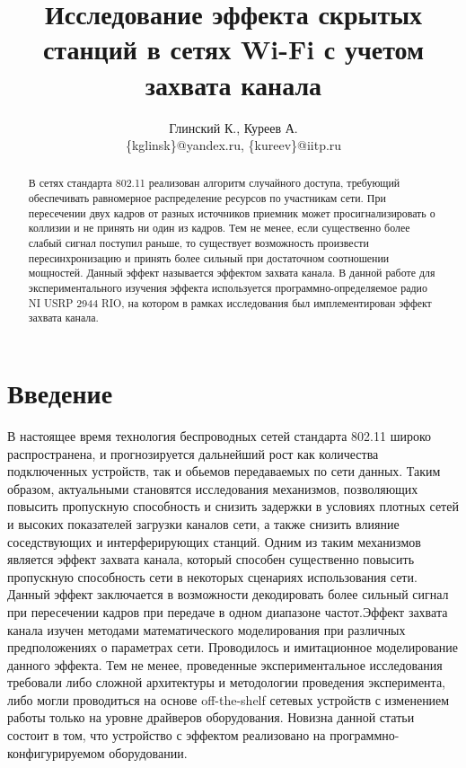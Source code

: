 \documentclass{llncs}
\title{Исследование эффекта скрытых станций в сетях Wi-Fi с учетом захвата канала}
\author{
Глинский К., Куреев А.\\
\{kglinsk\}@yandex.ru, \{kureev\}@iitp.ru\\
}
\institute{ИППИ РАН}
\begin{document}
\maketitle

\begin{abstract}
В сетях стандарта 802.11 реализован алгоритм случайного доступа, требующий обеспечивать равномерное распределение ресурсов по участникам сети. При пересечении двух кадров от разных источников приемник может просигнализировать о коллизии и не принять ни один из кадров. Тем не менее, если существенно более слабый сигнал поступил раньше, то существует  возможность произвести пересинхронизацию и принять более сильный при достаточном соотношении мощностей. Данный эффект называется эффектом захвата канала. В данной работе для экспериментального изучения эффекта используется  программно-определяемое радио NI USRP 2944 RIO, на котором в рамках  исследования  был имплементирован эффект захвата канала.
\end{abstract}


\section{Введение}
В настоящее время технология беспроводных сетей стандарта 802.11 широко распространена, и прогнозируется дальнейший рост как количества подключенных устройств, так и обьемов передаваемых по сети данных. Таким образом, актуальными становятся исследования механизмов, позволяющих повысить пропускную способность и снизить задержки в условиях плотных сетей и высоких показателей загрузки каналов сети, а также снизить влияние соседствующих и интерферирующих станций. Одним из таким механизмов является эффект захвата канала, который способен существенно повысить пропускную способность сети в некоторых сценариях использования сети. Данный эффект заключается в возможности декодировать более сильный сигнал при пересечении кадров при передаче в одном диапазоне частот.Эффект захвата канала изучен методами математического моделирования при различных предположениях о параметрах сети. Проводилось и имитационное моделирование данного эффекта. Тем не менее, проведенные  экспериментальное исследования требовали либо сложной архитектуры и методологии проведения эксперимента, либо могли проводиться на основе off-the-shelf сетевых устройств с изменением работы  только на уровне драйверов оборудования. Новизна данной статьи состоит в том, что устройство с эффектом реализовано на программно-конфигурируемом оборудовании.
\end{document}
